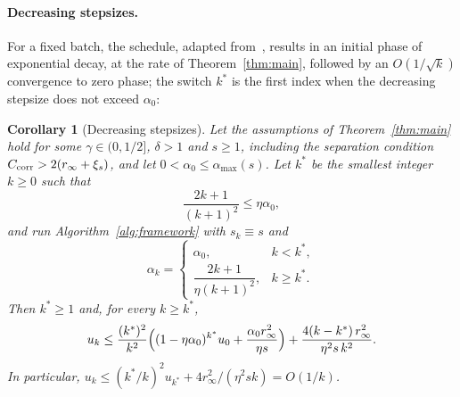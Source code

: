 \documentclass[pdflatex,sn-mathphys-num]{sn-jnl}
\theoremstyle{thmstyleone}
\newtheorem{corollary}{Corollary}
\theoremstyle{thmstylethree}
\begin{document}
\paragraph{Decreasing stepsizes.} For a fixed batch, the schedule, adapted from~\cite{gower2019sgd}, results in an initial phase of exponential decay, at the rate of
Theorem~\ref{thm:main}, followed by an $O(1/\sqrt{k})$ convergence to zero phase; the switch $k^*$ is the first
index when the decreasing stepsize does not exceed $\alpha_0$:
\begin{corollary}[Decreasing stepsizes]
\label{cor:diminishing_stepsize}
Let the assumptions of Theorem~\ref{thm:main} hold for some
$\gamma\in(0,1/2]$, $\delta>1$ and $s\ge1$, including the separation
condition $C_{\rm corr}>2(r_\infty+\xi_s)$, and let
$0<\alpha_0\le\alpha_{\max}(s)$. Let $k^*$ be the smallest integer $k\ge0$
such that
\[
\frac{2k+1}{(k+1)^2}\le\eta\alpha_0,
\]
and run Algorithm~\ref{alg:framework} with $s_k\equiv s$ and
\[
\alpha_k=
\begin{cases}
\alpha_0, & k<k^*,\\[1ex]
\dfrac{2k+1}{\eta(k+1)^2}, & k\ge k^*.
\end{cases}
\]
Then $k^*\ge1$ and, for every $k\ge k^*$,
\[
u_k\le\frac{(k^*)^2}{k^2}\Bigl((1-\eta\alpha_0)^{k^*}u_0
+\frac{\alpha_0r_\infty^2}{\eta s}\Bigr)
+\frac{4(k-k^*)\,r_\infty^2}{\eta^2s\,k^2}.
\]
In particular, $u_k\le(k^*/k)^2u_{k^*}+4r_\infty^2/(\eta^2sk)=O(1/k)$.
\end{corollary}
\end{document}

